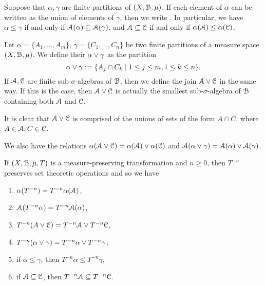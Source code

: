 \begin{definition}
	Suppose that $\alpha, \gamma$ are finite partitions of $(X, \mathcal{B}, \mu)$. If each element of $\alpha$ can be written as the union of elements of $\gamma$, then we write \key{$\alpha \leq \gamma$}. In particular, we have $\alpha \leq \gamma$ if and only if $\mathcal{A}(\alpha) \subseteq \mathcal{A}(\gamma)$, and $\mathcal{A} \subseteq \mathcal{C}$ if and only if $\alpha(\mathcal{A}) \leq \alpha(\mathcal{C})$.
\end{definition}

\begin{definition}
	Let $\alpha = \{A_1, \dots, A_m\}$, $\gamma = \{C_1, \dots, C_n\}$ be two finite partitions of a measure space $(X, \mathcal{B}, \mu)$. We define their  $\alpha \vee \gamma$ as the partition
	\[
		\alpha \vee \gamma := \{A_j \cap C_k \mid 1 \leq j \leq m, 1 \leq k \leq n\}.
	\]
	If $\mathcal{A}, \mathcal{C}$ are finite sub-$\sigma$-algebras of $\mathcal{B}$, then we define the join $\mathcal{A} \vee \mathcal{C}$ in the same way. If this is the case, then $\mathcal{A} \vee \mathcal{C}$ is actually the smallest sub-$\sigma$-algebra of $\mathcal{B}$ containing both $\mathcal{A}$ and $\mathcal{C}$.
	
	It is clear that $\mathcal{A} \vee \mathcal{C}$ is comprised of the unions of sets of the form $A \cap C$, where $A \in \mathcal{A}, C \in \mathcal{C}$.
	
	We also have the relations $\alpha(\mathcal{A} \vee \mathcal{C}) = \alpha(\mathcal{A}) \vee \alpha(\mathcal{C})$ and $\mathcal{A}(\alpha \vee \gamma) = \mathcal{A}(\alpha) \vee \mathcal{A}(\gamma)$.
\end{definition}

\begin{remark}
	If $(X,\mathcal{B}, \mu, T)$ is a measure-preserving transformation and $n \geq 0$, then $T^{-n}$ preserves set theoretic operations and so we have
	\begin{enumerate}
		\item $\alpha(T^{-n}) = T^{-n}{\alpha(\mathcal{A})}$,
		\item $\mathcal{A}(T^{-n}{\alpha}) = T^{-n}{\mathcal{A}(\alpha)}$,
		\item $T^{-n}(A \vee \mathcal{C}) = T^{-n}{\mathcal{A}} \vee T^{-n}{\mathcal{C}}$,
		\item $T^{-n}(\alpha \vee \gamma) = T^{-n}{\alpha} \vee T^{-n}{\gamma}$,
		\item if $\alpha \leq \gamma$, then $T^{-n}{\alpha} \leq T^{-n}{\gamma}$,
		\item if $\mathcal{A} \subseteq \mathcal{C}$, then $T^{-n}{\mathcal{A}} \subseteq T^{-n}{\mathcal{C}}$.
	\end{enumerate}
\end{remark}

